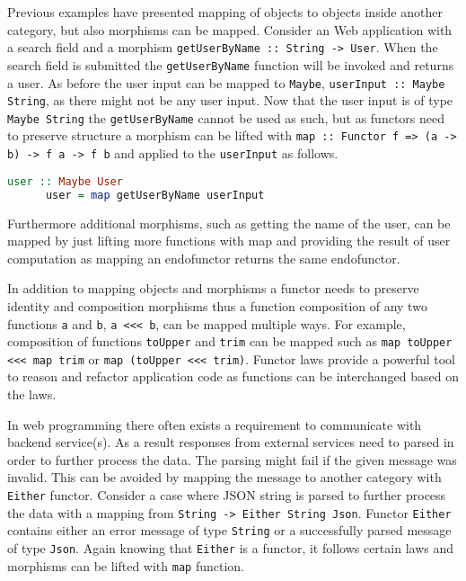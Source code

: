 \documentclass[article]{aaltoseries}
\begin{document}
    Previous examples have presented mapping of objects to objects inside
    another category, but also morphisms can be mapped. Consider an Web
    application with a search field and a morphism
    \lstinline|getUserByName :: String -> User|. When the search field is
    submitted the \lstinline|getUserByName| function will be invoked and returns
    a user. As before the user input can be mapped to \lstinline|Maybe|,
    \lstinline|userInput :: Maybe String|, as there might not be any user input.
    Now that the user input is of type \lstinline|Maybe String| the
    \lstinline|getUserByName| cannot be used as such, but as functors need to
    preserve structure a morphism can be lifted with
    \lstinline|map :: Functor f => (a -> b) -> f a -> f b| and applied to the
    \lstinline|userInput| as follows. 

    \begin{lstlisting}[language=Haskell]
      user :: Maybe User
      user = map getUserByName userInput
    \end{lstlisting}

    Furthermore additional morphisms, such as getting the name of the user, can
    be mapped by just lifting more functions with map and providing the result
    of user computation as mapping an endofunctor returns the same endofunctor.
 
    In addition to mapping objects and morphisms a functor needs to preserve
    identity and composition morphisms thus a function composition of any two
    functions \lstinline|a| and \lstinline|b|, \lstinline|a <<< b|, can be
    mapped multiple ways. For example, composition of functions
    \lstinline|toUpper| and \lstinline|trim| can be mapped such as
    \lstinline|map toUpper <<< map trim| or \lstinline|map (toUpper <<< trim)|.
    Functor laws provide a powerful tool to reason and refactor application code
    as functions can be interchanged based on the laws.

    In web programming there often exists a requirement to communicate with
    backend service(s). As a result responses from external services need to
    parsed in order to further process the data. The parsing might fail if the
    given message was invalid. This can be avoided by mapping the message to
    another category with \lstinline|Either| functor. Consider a case where JSON
    string is parsed to further process the data with a mapping from
    \lstinline|String -> Either String Json|. Functor \lstinline|Either|
    contains either an error message of type \lstinline|String| or a
    successfully parsed message of type \lstinline|Json|. Again knowing that
    \lstinline|Either| is a functor, it follows certain laws and morphisms can
    be lifted with \lstinline|map| function.
\end{document}
